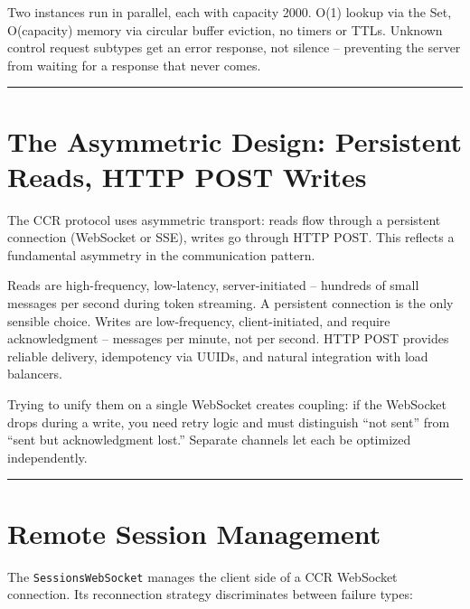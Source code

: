 \documentclass[
  english,
  11pt,
  letterpaper,
]{book}
\begin{document}
Two instances run in parallel, each with capacity 2000. O(1) lookup via
the Set, O(capacity) memory via circular buffer eviction, no timers or
TTLs. Unknown control request subtypes get an error response, not
silence -- preventing the server from waiting for a response that never
comes.

\begin{center}\rule{0.5\linewidth}{0.5pt}\end{center}

\section{The Asymmetric Design: Persistent Reads, HTTP POST
Writes}\label{the-asymmetric-design-persistent-reads-http-post-writes}

The CCR protocol uses asymmetric transport: reads flow through a
persistent connection (WebSocket or SSE), writes go through HTTP POST.
This reflects a fundamental asymmetry in the communication pattern.

Reads are high-frequency, low-latency, server-initiated -- hundreds of
small messages per second during token streaming. A persistent
connection is the only sensible choice. Writes are low-frequency,
client-initiated, and require acknowledgment -- messages per minute, not
per second. HTTP POST provides reliable delivery, idempotency via UUIDs,
and natural integration with load balancers.

Trying to unify them on a single WebSocket creates coupling: if the
WebSocket drops during a write, you need retry logic and must
distinguish ``not sent'' from ``sent but acknowledgment lost.'' Separate
channels let each be optimized independently.

\begin{center}\rule{0.5\linewidth}{0.5pt}\end{center}

\section{Remote Session Management}\label{remote-session-management}

The \texttt{SessionsWebSocket} manages the client side of a CCR
WebSocket connection. Its reconnection strategy discriminates between
failure types:
\end{document}
